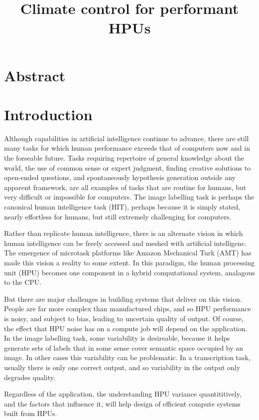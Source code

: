 \documentclass[letterpaper, 11pt, twocolumn]{article}
\title{Climate control for performant HPUs}
\author{}
\begin{document}
\maketitle

\section*{Abstract}
\textbf{}
\section*{Introduction}
Although capabilities in artificial intelligence continue to advance, 
there are still many tasks for which human performance exceeds that of 
computers now and in the forseable future.  Tasks requiring repertoire of 
general knowledge about the world, the use of common sense or expert judgment, 
finding creative solutions to open-ended questions, and spontaneously 
hypothesis generation outside any apparent framework, are all examples of 
tasks that are routine for humans, but very difficult or impossible for 
computers.  The image labelling task is perhaps the canonical human 
intelligence task (HIT), perhaps because it is simply stated, nearly effortless
for humans, but still extremely challenging for computers.

Rather than replicate human intelligence, there is an alternate vision in 
which human intelligence can be freely accessed and meshed with artificial
intelligenc.  The emergence of microtask platforms like Amazon Mechanical 
Turk (AMT) has made this vision a reality to some extent.  In this paradigm,
the human processing unit (HPU) becomes one component in a hybrid 
computational system, analagous to the CPU.

But there are major challenges in building systems that deliver on this 
vision.  People are far more complex than manufactured chips, 
and so HPU performance is noisy, and subject to bias, leading to uncertain
quality of output.  Of course, the effect that HPU noise has on a compute job 
will depend on the application.
In the image labelling task, some variability is desireable, because it helps
generate sets of labels that in some sense cover semantic space occupied by an 
image.  In other cases this variability can be problematic.  In a 
transcription task, usually there is only one correct output, and so 
variability in the output only degrades quality.

Regardless of the application, the understanding HPU variance quantititively,
and the factors that influence it, will help design of efficient compute 
systems built from HPUs.
\end{document}
